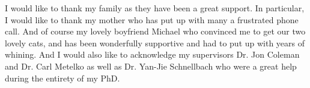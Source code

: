 
\begin{acknowledgements}      

I would like to thank my family as they have been a great support. In particular, I would like to thank my mother who has put up with many a frustrated phone call. And of course my lovely boyfriend Michael who convinced me to get our two lovely cats, and has been wonderfully supportive and had to put up with years of whining. And I would also like to acknowledge my supervisors Dr. Jon Coleman and Dr. Carl Metelko as well as Dr. Yan-Jie Schnellbach who were a great help during the entirety of my PhD. 


\end{acknowledgements}
